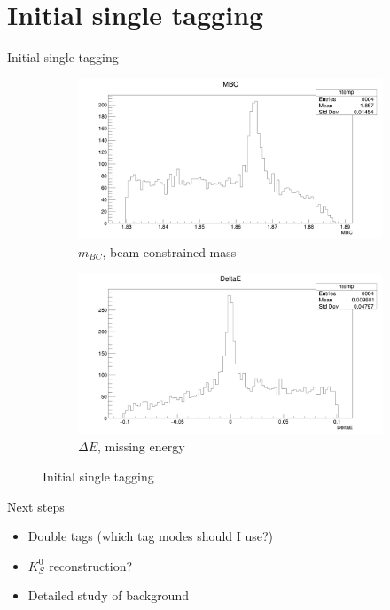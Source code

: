 \documentclass{beamer}
\begin{document}
\section{Initial single tagging}
\begin{frame}{Initial single tagging}
  \begin{figure}
    \centering
    \begin{subfigure}{0.5\textwidth}
      \centering
      \includegraphics[width=\textwidth]{MBC.png}
      \caption{$m_{BC}$, beam constrained mass}
    \end{subfigure}%
    \begin{subfigure}{0.5\textwidth}
      \centering
      \includegraphics[width=\textwidth]{DeltaE.png}
      \caption{$\Delta E$, missing energy}
    \end{subfigure}
    \caption{Initial single tagging}
  \end{figure}
\end{frame}

\begin{frame}{Next steps}
  \begin{itemize}
    \item{Double tags (which tag modes should I use?)}
    \item{$K_S^0$ reconstruction?}
    \item{Detailed study of background}
  \end{itemize}
\end{frame}
\end{document}
